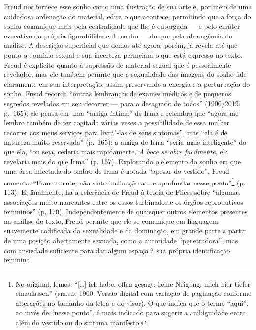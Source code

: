 Freud nos fornece esse sonho como uma ilustração de sua arte e, por meio
de uma cuidadosa ordenação do material, edita o que acontece, permitindo
que a força do sonho comunique mais pela centralidade que lhe é
outorgada --- e pelo caráter evocativo da própria figurabilidade do sonho
--- do que pela abrangência da análise. A descrição superficial que demos
até agora, porém, já revela até que ponto o domínio sexual e sua
incerteza permeiam o que está expresso no texto. Freud é explícito
quanto à supressão de material sexual que é pessoalmente revelador, mas
ele também permite que a sexualidade das imagens do sonho fale
claramente em sua interpretação, assim preservando a energia e a
perturbação do sonho. Freud recorda ``outras lembranças de exames
médicos e de pequenos segredos revelados em seu decorrer --- para o
desagrado de todos'' (1900/2019, p.~165); ele pensa em uma
``amiga íntima'' de Irma e relembra que ``agora me lembro também de ter
cogitado várias vezes a possibilidade de essa mulher recorrer aos meus
serviços para livrá"-las de seus sintomas'', mas ``ela é de natureza
muito reservada'' (p.~165); a amiga de Irma ``seria mais inteligente'' do
que ela, ``ou seja, cederia mais rapidamente. \emph{A boca se abre
facilmente,} ela revelaria mais do que Irma'' (p. 167). Explorando o
elemento do sonho em que uma área infectada do ombro de Irma é notada
``apesar do vestido'', Freud comenta: ``Francamente, não sinto
inclinação a me aprofundar nesse ponto''\footnote{No original, lemos:
  ``{[}\ldots{}{]} ich habe, offen gesagt, keine Neigung, mich hier
  tiefer einzulassen'' (\textsc{freud}, 1900. Versão digital com variação de
  paginação conforme alterações no tamanho da letra e do visor). O que
  indica que o termo ``aqui'', ao invés de ``nesse ponto'', é mais
  indicado para sugerir a ambiguidade entre além do vestido ou do
  sintoma manifesto.} (p. 113). E, finalmente, há a referência de Freud
à teoria de Fliess sobre ``algumas associações muito marcantes entre os
ossos turbinados e os órgãos reprodutivos femininos'' (p. 170).
Independentemente de quaisquer outros elementos presentes na análise do
texto, Freud permite que ele se comunique em linguagem suavemente
codificada da sexualidade e da dominação, em grande parte a partir de
uma posição abertamente sexuada, como a autoridade ``penetradora'', mas
com ansiedade suficiente para dar algum espaço à sua própria
identificação feminina.

